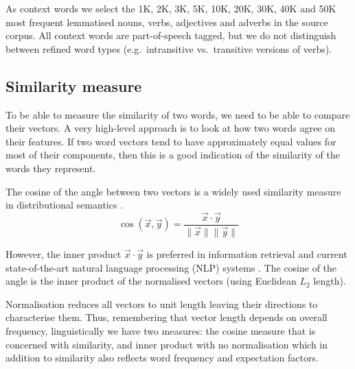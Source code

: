 As context words we select the 1K, 2K, 3K, 5K, 10K, 20K, 30K, 40K and 50K most frequent lemmatised nouns, verbs, adjectives and adverbs in the source corpus. All context words are part-of-speech tagged, but we do not distinguish between refined word types (e.g.~intransitive vs.~transitive versions of verbs).

\subsection{Similarity measure}
\label{sec:similarity-measure}

To be able to measure the similarity of two words, we need to be able to compare their vectors. A very high-level approach is to look at how two words agree on their features. If two word vectors tend to have approximately equal values for most of their components, then this is a good indication of the similarity of the words they represent.

The cosine of the angle between two vectors is a widely used similarity measure in distributional semantics \cite{Turney:2010:FMV:1861751.1861756,lapesa2014large}.
%
\begin{equation*}
  \label{eq:cos}
  \cos(\vec{x}, \vec{y}) = \frac{\vec{x} \cdot \vec{y}}
                                {\|\vec{x}\| \|\vec{y}\|}
\end{equation*}

However, the inner product $\vec{x} \cdot \vec{y}$ is preferred in information retrieval and current state-of-the-art natural language processing (NLP) systems \cite{mikolov2013distributed,mikolov2013linguistic,TACL570}. The cosine of the angle is the inner product of the normalised vectors (using Euclidean $L_2$ length).
%
%

Normalisation reduces all vectors to unit length leaving their directions to characterise them. Thus, remembering that vector length depends on overall frequency, linguistically we have two measures: the cosine measure that is concerned with similarity, and inner product with no normalisation which in addition to similarity also reflects word frequency and expectation factors.
%
%

